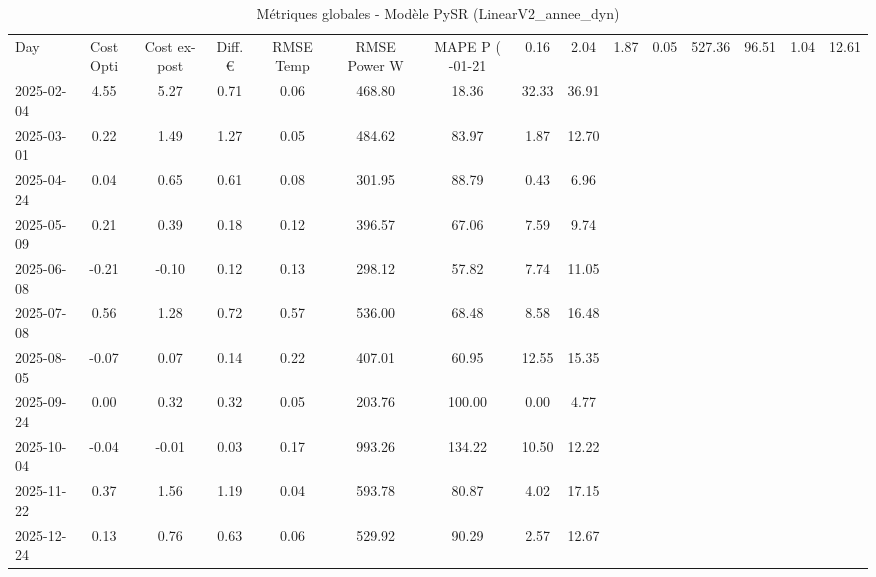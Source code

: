 \begin{table}
\caption{Métriques globales - Modèle PySR (LinearV2_annee_dyn)}
\label{tab:PySR_LinearV2_annee_dyn_Validation_EPlus_VS_Opti}
\begin{small}
\begin{tabular}{lcccccccc}
\toprule
Day & Cost Opti & Cost ex-post & Diff. € & RMSE Temp & RMSE Power W & MAPE P (%
-01-21 & 0.16 & 2.04 & 1.87 & 0.05 & 527.36 & 96.51 & 1.04 & 12.61 \\
2025-02-04 & 4.55 & 5.27 & 0.71 & 0.06 & 468.80 & 18.36 & 32.33 & 36.91 \\
2025-03-01 & 0.22 & 1.49 & 1.27 & 0.05 & 484.62 & 83.97 & 1.87 & 12.70 \\
2025-04-24 & 0.04 & 0.65 & 0.61 & 0.08 & 301.95 & 88.79 & 0.43 & 6.96 \\
2025-05-09 & 0.21 & 0.39 & 0.18 & 0.12 & 396.57 & 67.06 & 7.59 & 9.74 \\
2025-06-08 & -0.21 & -0.10 & 0.12 & 0.13 & 298.12 & 57.82 & 7.74 & 11.05 \\
2025-07-08 & 0.56 & 1.28 & 0.72 & 0.57 & 536.00 & 68.48 & 8.58 & 16.48 \\
2025-08-05 & -0.07 & 0.07 & 0.14 & 0.22 & 407.01 & 60.95 & 12.55 & 15.35 \\
2025-09-24 & 0.00 & 0.32 & 0.32 & 0.05 & 203.76 & 100.00 & 0.00 & 4.77 \\
2025-10-04 & -0.04 & -0.01 & 0.03 & 0.17 & 993.26 & 134.22 & 10.50 & 12.22 \\
2025-11-22 & 0.37 & 1.56 & 1.19 & 0.04 & 593.78 & 80.87 & 4.02 & 17.15 \\
2025-12-24 & 0.13 & 0.76 & 0.63 & 0.06 & 529.92 & 90.29 & 2.57 & 12.67 \\
\bottomrule
\end{tabular}
\end{small}
\end{table}
